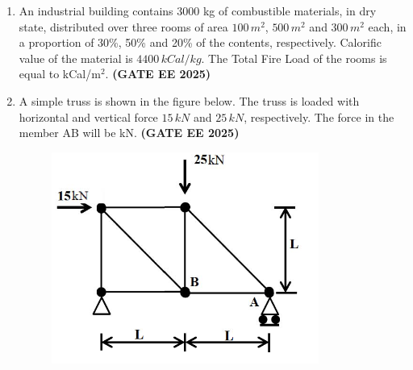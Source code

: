 \documentclass[journal,12pt,onecolumn]{IEEEtran}
\theoremstyle{remark}
\begin{document}
\begin{enumerate}
\item An industrial building contains 3000 kg of combustible materials, in dry state, distributed over three rooms of area $100 \, m^2$, $500 \, m^2$ and $300 \, m^2$ each, in a proportion of 30\%, 50\% and 20\% of the contents, respectively. Calorific value of the material is $4400 \, kCal/kg$. The Total Fire Load of the rooms is equal to \underline{\makebox[2cm]{\hfill}} kCal/m$^2$. \hfill \textbf{(GATE EE 2025)}\\
\item A simple truss is shown in the figure below. The truss is loaded with horizontal and vertical force $15 \, kN$ and $25 \, kN$, respectively. The force in the member AB will be \underline{\makebox[2cm]{\hfill}} kN. \hfill \textbf{(GATE EE 2025)} \\
\begin{figure}[H]
    \centering
    \includegraphics[width=0.5\linewidth]{figs/fig6.png}
    \caption{}
    \label{fig6}
\end{figure}
\end{enumerate}
\end{document}
